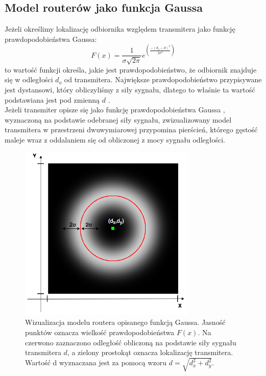 \subsection{Model routerów jako funkcja Gaussa}
Jeżeli określimy lokalizację odbiornika względem transmitera jako funkcję prawdopodobieństwa Gaussa:
\begin{equation}
F(x) = \frac{1}{\sigma\sqrt{2\pi}}e^{\left(\frac{-(d_o-d)^2}{2\sigma^2}\right)}
\end{equation}
to wartość funkcji określa, jakie jest prawdopodobieństwo, że odbiornik znajduje się w odległości $d_o$ od transmitera. Największe prawdopodobieństwo przypisywane jest dystansowi, który obliczyliśmy z siły sygnału, dlatego to właśnie ta wartość podstawiana jest pod zmienną $d$ \cite{JK}.\\
Jeżeli transmiter opisze się jako funkcję prawdopodobieństwa Gaussa \cite{YX}, wyznaczoną na podstawie odebranej siły sygnału, zwizualizowany model transmitera w przestrzeni dwuwymiarowej przypomina pierścień, którego gęstość maleje wraz z oddalaniem się od obliczonej z mocy sygnału odległości.
\begin{figure}[H]			
	\centering
	\caption{Wizualizacja modelu routera opisanego funkcją Gaussa. Jasność punktów oznacza wielkość prawdopodobieństwa $F(x)$. Na czerwono zaznaczono odległość obliczoną na podstawie siły sygnału transmitera $d$, a zielony prostokąt oznacza lokalizację transmitera. Wartość d wyznaczana jest za pomocą wzoru $d = \sqrt{d_x^2 + d_y^2}$.}
	\includegraphics[width=0.75\textwidth]{router_Gaussa_wizualizacja}
\end{figure}
